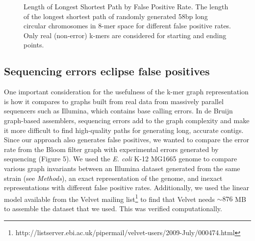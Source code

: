 \documentclass[12pt]{article} \usepackage{simplemargins}
\begin{document}
\begin{figure}
\caption{Length of Longest Shortest Path by False Positive Rate. The 
length of the longest shortest path of randomly generated 58bp 
long circular chromosomes in 8-mer 
space for different false positive rates. Only real (non-error) k-mers are
considered for starting and ending points.}
\end{figure}

\subsection{Sequencing errors eclipse false positives}
One important consideration for the usefulness of the
k-mer graph representation is how it compares to graphs built from
real data from massively parallel sequencers such as Illumina, which
contains base calling errors.  In de Bruijn graph-based assemblers,
sequencing errors add to the graph complexity and make it more
difficult to find high-quality paths for generating long, accurate
contigs. Since our approach also generates false positives, we wanted to
compare the error rate from the Bloom filter graph with experimental
errors generated by sequencing (Figure 5). We used the
\emph{E. coli} K-12 MG1665 genome to compare various graph invariants
between an Illumina dataset generated from the same strain (see \emph{Methods}),
an exact representation of the genome, and inexact representations
with different false positive rates. Additionally, we used the linear 
model available 
from the Velvet mailing list\footnote{http://listserver.ebi.ac.uk/pipermail/velvet-users/2009-July/000474.html} to find that Velvet needs $\sim 876$ MB 
to assemble the dataset that we used.  This was verified computationally.
\end{document}
